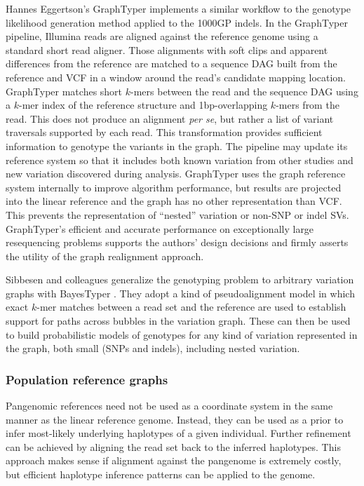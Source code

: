 Hannes Eggertson's GraphTyper \cite{eggertsson2017graphtyper} implements a similar workflow to the genotype likelihood generation method applied to the 1000GP indels.
In the GraphTyper pipeline, Illumina reads are aligned against the reference genome using a standard short read aligner.
Those alignments with soft clips and apparent differences from the reference are matched to a sequence DAG built from the reference and VCF in a window around the read's candidate mapping location.
GraphTyper matches short $k$-mers between the read and the sequence DAG using a $k$-mer index of the reference structure and 1bp-overlapping $k$-mers from the read.
This does not produce an alignment \emph{per se}, but rather a list of variant traversals supported by each read.
This transformation provides sufficient information to genotype the variants in the graph.
The pipeline may update its reference system so that it includes both known variation from other studies and new variation discovered during analysis.
GraphTyper uses the graph reference system internally to improve algorithm performance, but results are projected into the linear reference and the graph has no other representation than VCF.
This prevents the representation of ``nested'' variation or non-SNP or indel SVs.
GraphTyper's efficient and accurate performance on exceptionally large resequencing problems supports the authors' design decisions and firmly asserts the utility of the graph realignment approach.

Sibbesen and colleagues generalize the genotyping problem to arbitrary variation graphs with BayesTyper \cite{sibbesen2018accurate}.
They adopt a kind of pseudoalignment model in which exact $k$-mer matches between a read set and the reference are used to establish support for paths across bubbles in the variation graph.
These can then be used to build probabilistic models of genotypes for any kind of variation represented in the graph, both small (SNPs and indels), including nested variation.

\subsubsection{Population reference graphs}

Pangenomic references need not be used as a coordinate system in the same manner as the linear reference genome.
Instead, they can be used as a prior to infer most-likely underlying haplotypes of a given individual.
Further refinement can be achieved by aligning the read set back to the inferred haplotypes.
This approach makes sense if alignment against the pangenome is extremely costly, but efficient haplotype inference patterns can be applied to the genome.

